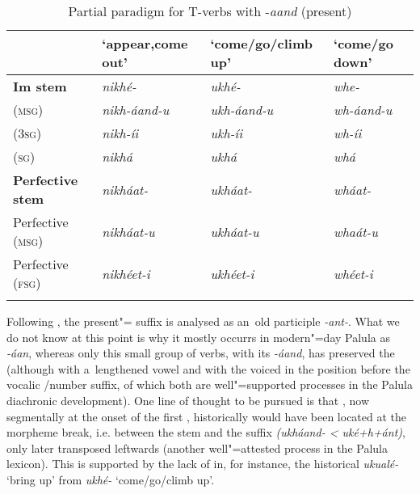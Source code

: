 \begin{table}[t]
\caption{Partial paradigm for T-verbs with -\textit{aand} (present)}
\begin{tabularx}{\textwidth}{ l Q Q Q }
\lsptoprule
&
`appear,\newline come out' &
`come/go/\newline climb up' &
`come/go down'\\\midrule
\textbf{Im stem} &
\textit{nikhé- } &
\textit{ukhé-} &
\textit{whe-} \\
 (\textsc{msg}) &
\textit{nikh-áand-u} &
\textit{ukh-áand-u} &
\textit{wh-áand-u} \\
 (\textsc{3sg}) &
\textit{nikh-íi} &
\textit{ukh-íi} &
\textit{wh-íi} \\
 (\textsc{sg}) &
\textit{nikhá} &
\textit{ukhá} &
\textit{whá} \\
\textbf{Perfective stem} &
\textit{nikháat-} &
\textit{ukháat-} &
\textit{wháat-} \\
Perfective (\textsc{msg}) &
\textit{nikháat-u} &
\textit{ukháat-u} &
\textit{whaát-u} \\
Perfective (\textsc{fsg}) &
\textit{nikhéet-i} &
\textit{ukhéet-i} &
\textit{whéet-i} \\\lspbottomrule
\end{tabularx}
\label{tab:8-10}
\end{table}


Following \citet[22]{morgenstierne1941}, the present"= suffix is analysed as an~old participle \textit{-ant-}. What we do not know at this point is why it mostly occurrs in modern"=day Palula as \textit{-áan}, whereas only this small group of verbs, with its \textit{-áand}, has preserved the  (although with a~lengthened vowel and with the  voiced in the position before the vocalic /number suffix, of which both are well"=supported processes in the Palula diachronic development). One line of thought to be pursued is that , now segmentally at the onset of the first , historically would have been located at the morpheme break, i.e. between the stem and the  suffix \textit{(ukháand- {\textless} uké+h+ánt)}, only later transposed leftwards (another well"=attested process in the Palula lexicon). This is supported by the lack of  in, for instance, the historical  \textit{ukualé-} `bring up' from \textit{ukhé-} `come/go/climb up'.


